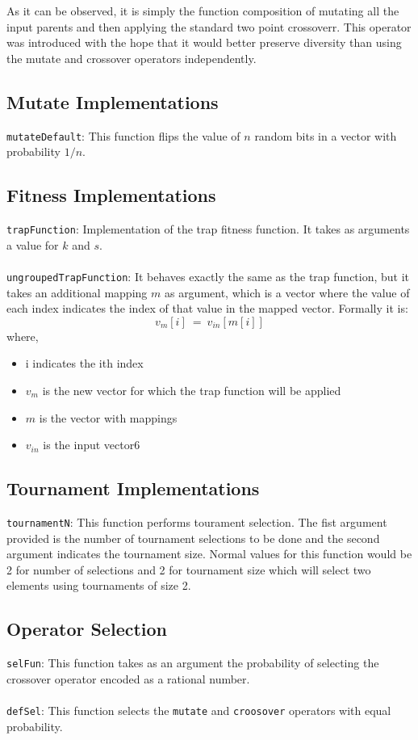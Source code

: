 \documentclass[10pt]{article}
\begin{document}
As it can be observed, it is simply the function composition of mutating all the input parents and then applying the standard two point crossoverr. This operator was introduced with the hope that it would better preserve diversity than using the mutate and crossover operators independently.

\subsection{Mutate Implementations}

\verb+mutateDefault+: This function flips the value of $n$ random bits in a vector with probability $1/n$.

\subsection{Fitness Implementations}

\verb+trapFunction+: Implementation of the trap fitness function. It takes as arguments a value for $k$ and $s$.
\\\\
\verb+ungroupedTrapFunction+: It behaves exactly the same as the trap function, but it takes an additional mapping $m$ as argument, which is a vector where the value of each index indicates the index of that value in the mapped vector. Formally it is:
\[
v_m[i]\ =\ v_{in}[m[i]]
\]
where,
\begin{itemize}
  \item i indicates the ith index
  \item $v_m$ is the new vector for which the trap function will be applied
  \item $m$ is the vector with mappings
  \item $v_{in}$ is the input vector6
\end{itemize}

\subsection{Tournament Implementations}

\verb+tournamentN+: This function performs tourament selection. The fist argument provided is the number of tournament selections to be done and the second argument indicates the tournament size. Normal values for this function would be 2 for number of selections and 2 for tournament size which will select two elements using tournaments of size 2.

\subsection{Operator Selection}
\verb+selFun+: This function takes as an argument the probability of selecting the crossover operator encoded as a rational number.
\\\\
\verb+defSel+: This function selects the \verb+mutate+ and \verb+croosover+ operators with equal probability.
\end{document}
